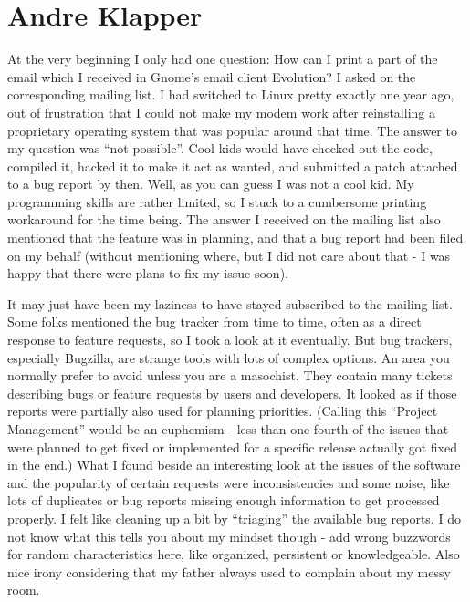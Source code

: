 \chapter{Andre Klapper}
At the very beginning I only had one question: How can I print a part of the
email which I received in Gnome's email client Evolution? I asked on the
corresponding mailing list.
I had switched to Linux pretty exactly one year ago, out of frustration that I
could not make my modem work after reinstalling a proprietary operating system
that was popular around that time.
The answer to my question was ``not possible''. Cool kids would have checked out
the code, compiled it, hacked it to make it act as wanted, and submitted a patch
attached to a bug report by then. Well, as you can guess I was not a cool kid.
My programming skills are rather limited, so I stuck to a cumbersome printing
workaround for the time being. The answer I received on the mailing list also
mentioned that the feature was in planning, and that a bug report had been filed
on my behalf (without mentioning where, but I did not care about that - I was
happy that there were plans to fix my issue soon).

It may just have been my laziness to have stayed subscribed to the mailing list.
Some folks mentioned the bug tracker from time to time, often as a direct
response to feature requests, so I took a look at it eventually. But bug
trackers, especially Bugzilla, are strange tools with lots of complex options.
An area you normally prefer to avoid unless you are a masochist. They contain
many tickets describing bugs or feature requests by users and developers. It
looked as if those reports were partially also used for planning priorities.
(Calling this ``Project Management'' would be an euphemism - less than one
fourth of the issues that were planned to get fixed or implemented for a
specific release actually got fixed in the end.)
What I found beside an interesting look at the issues of the software and the
popularity of certain requests were inconsistencies and some noise, like lots of
duplicates or bug reports missing enough information to get processed properly.
I felt like cleaning up a bit by ``triaging'' the available bug reports. I do
not know what this tells you about my mindset though - add wrong buzzwords for
random characteristics here, like organized, persistent or knowledgeable. Also
nice irony considering that my father always used to complain about my messy
room.

